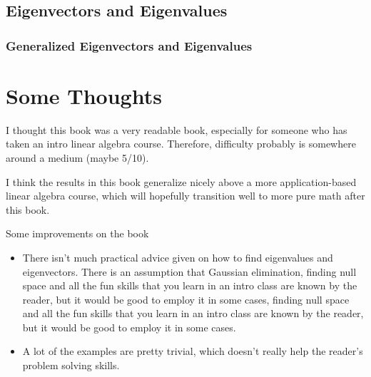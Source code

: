\section{Eigenvectors and Eigenvalues}

\subsection{Generalized Eigenvectors and Eigenvalues}

\chapter{Some Thoughts}

I thought this book was a very readable book, especially for someone who has taken an intro linear algebra course.
Therefore, difficulty probably is somewhere around a medium (maybe 5/10).

I think the results in this book generalize nicely above a more application-based linear algebra course, which will hopefully transition well to more pure math after this book.

Some improvements on the book
\begin{itemize}
  \item There isn't much practical advice given on how to find eigenvalues and eigenvectors. There is an assumption that Gaussian elimination, finding null space and all the fun skills that you learn in an intro class are known by the reader, but it would be good to employ it in some cases, finding null space and all the fun skills that you learn in an intro class are known by the reader, but it would be good to employ it in some cases.
  \item A lot of the examples are pretty trivial, which doesn't really help the reader's problem solving skills.
\end{itemize}